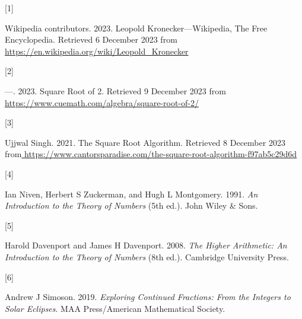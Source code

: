 \documentclass[
  a4paper,
]{article}
\newlength{\cslhangindent}
\newlength{\csllabelwidth}
\newlength{\cslentryspacingunit} %
\newenvironment{CSLReferences}[2] %
 {%
  \setlength{\parindent}{0pt}
  \ifodd #1
  \let\oldpar\par
  \def\par{\hangindent=\cslhangindent\oldpar}
  \fi
  \setlength{\parskip}{#2\cslentryspacingunit}
 }%
 {}
\newcommand{\CSLLeftMargin}[1]{\parbox[t]{\csllabelwidth}{#1}}
\newcommand{\CSLRightInline}[1]{\parbox[t]{\linewidth - \csllabelwidth}{#1}\break}
\begin{document}
\hypertarget{refs}{}
\begin{CSLReferences}{0}{0}
\leavevmode{}%
\CSLLeftMargin{{[}1{]} }%
\CSLRightInline{Wikipedia contributors. 2023. {Leopold
Kronecker---Wikipedia, The Free Encyclopedia}. Retrieved 6 December 2023
from \url{https://en.wikipedia.org/wiki/Leopold_Kronecker}}

\leavevmode{}%
\CSLLeftMargin{{[}2{]} }%
\CSLRightInline{---. 2023. {Square Root of 2}. Retrieved 9 December 2023
from \url{https://www.cuemath.com/algebra/square-root-of-2/}}

\leavevmode{}%
\CSLLeftMargin{{[}3{]} }%
\CSLRightInline{Ujjwal Singh. 2021. {The Square Root Algorithm}.
Retrieved 8 December 2023
from\href{\%0A\%20\%20\%20\%20\%20\%20\%20\%20\%20\%20\%20https://www.cantorsparadise.com/the-square-root-algorithm-f97ab5c29d6d\%0A\%20\%20\%20\%20\%20\%20\%20\%20\%20\%20\%20}{
https://www.cantorsparadise.com/the-square-root-algorithm-f97ab5c29d6d
}}

\leavevmode{}%
\CSLLeftMargin{{[}4{]} }%
\CSLRightInline{Ian Niven, Herbert S Zuckerman, and Hugh L Montgomery.
1991. \emph{{An Introduction to the Theory of Numbers}} (5th ed.). John
Wiley \& Sons.}

\leavevmode{}%
\CSLLeftMargin{{[}5{]} }%
\CSLRightInline{Harold Davenport and James H Davenport. 2008. \emph{{The
Higher Arithmetic}: {An Introduction to the Theory of Numbers}} (8th
ed.). Cambridge University Press.}

\leavevmode{}%
\CSLLeftMargin{{[}6{]} }%
\CSLRightInline{Andrew J Simoson. 2019. \emph{{Exploring Continued
Fractions}: {From the Integers to Solar Eclipses}}. MAA Press/American
Mathematical Society.}

\end{CSLReferences}
\end{document}
